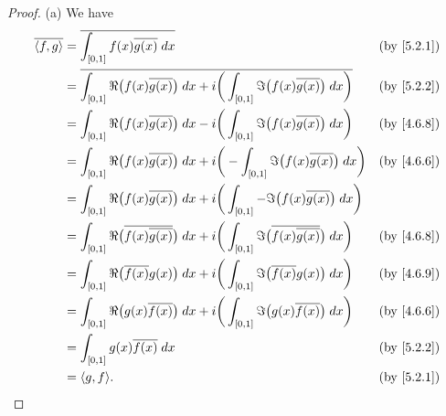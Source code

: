 \begin{proof}{(a)}
  We have
  \begin{align*}
    \overline{\inner*{f, g}} & = \overline{\int_{[0, 1]} f(x) \overline{g(x)} \; dx}                                                                                               &  & \by{5.2.1} \\
                             & = \overline{\int_{[0, 1]} \Re\big(f(x) \overline{g(x)}\big) \; dx + i \bigg(\int_{[0, 1]} \Im\big(f(x) \overline{g(x)}\big) \; dx\bigg)}            &  & \by{5.2.2} \\
                             & = \int_{[0, 1]} \Re\big(f(x) \overline{g(x)}\big) \; dx - i \bigg(\int_{[0, 1]} \Im\big(f(x) \overline{g(x)}\big) \; dx\bigg)                       &  & \by{4.6.8} \\
                             & = \int_{[0, 1]} \Re\big(f(x) \overline{g(x)}\big) \; dx + i \bigg(-\int_{[0, 1]} \Im\big(f(x) \overline{g(x)}\big) \; dx\bigg)                      &  & \by{4.6.6} \\
                             & = \int_{[0, 1]} \Re\big(f(x) \overline{g(x)}\big) \; dx + i \bigg(\int_{[0, 1]} -\Im\big(f(x) \overline{g(x)}\big) \; dx\bigg)                                      \\
                             & = \int_{[0, 1]} \Re\big(\overline{f(x) \overline{g(x)}}\big) \; dx + i \bigg(\int_{[0, 1]} \Im\big(\overline{f(x) \overline{g(x)}}\big) \; dx\bigg) &  & \by{4.6.8} \\
                             & = \int_{[0, 1]} \Re\big(\overline{f(x)} g(x)\big) \; dx + i \bigg(\int_{[0, 1]} \Im\big(\overline{f(x)} g(x)\big) \; dx\bigg)                       &  & \by{4.6.9} \\
                             & = \int_{[0, 1]} \Re\big(g(x) \overline{f(x)}\big) \; dx + i \bigg(\int_{[0, 1]} \Im\big(g(x) \overline{f(x)}\big) \; dx\bigg)                       &  & \by{4.6.6} \\
                             & = \int_{[0, 1]} g(x) \overline{f(x)} \; dx                                                                                                          &  & \by{5.2.2} \\
                             & = \inner*{g, f}.                                                                                                                                    &  & \by{5.2.1}
  \end{align*}
\end{proof}

